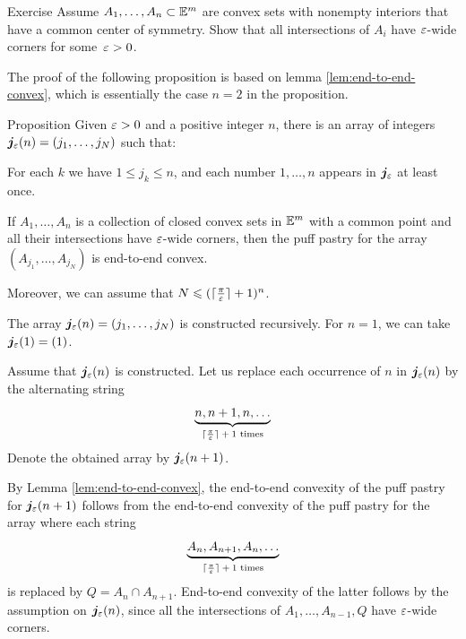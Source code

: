 \begin{thm}[!]{Exercise}\label{ex:centrally-simmetric-walls}
Assume $A_1,\ldots,A_n\subset\mathbb{E}^m$ are
convex sets with nonempty interiors that have a common center of symmetry.
Show that all intersections of $A_i$ have $\varepsilon$-wide corners for some~$\varepsilon>0$.
\end{thm}

The proof of the following proposition is based on lemma \ref{lem:end-to-end-convex}, which is essentially the case $n=2$ in the proposition.

\begin{thm}{Proposition}\label{prop:end-to-end-convex}
Given $\varepsilon>0$ and a positive integer $n$, 
there is an array of integers $\bm{j}_\varepsilon(n)=(j_1,\ldots,j_N)$
such that: 

\begin{subthm}{} For each $k$ we have $1\le j_k\le n$,
and each number $1,\ldots,n$ appears in $\bm{j}_\varepsilon$ at least once.
\end{subthm}

\begin{subthm}{}
If $A_1,\ldots,A_n$ is a collection of closed convex sets in $\mathbb{E}^m$ with a common point
and all their intersections have $\varepsilon$-wide corners,  
then the puff pastry for the array
$(A_{j_1},\ldots,A_{j_N})$ is end-to-end convex.
\end{subthm}

Moreover, we can assume that $N\leqslant (\lceil\tfrac\pi{\varepsilon}\rceil+1)^n$.
\end{thm}

The array $\bm{j}_\varepsilon(n)=(j_1,\ldots,j_N)$  is constructed recursively.
For $n=1$, we can take $\bm{j}_\varepsilon(1)=(1)$.

Assume that $\bm{j}_\varepsilon(n)$ is constructed.
Let us replace each occurrence of $n$ in $\bm{j}_\varepsilon(n)$ by the alternating string 
\[\underbrace{n,n+1,n,\ldots}_{\text{$\lceil\tfrac\pi{\varepsilon}\rceil+1$ times}}\]
Denote the obtained array by $\bm{j}_\varepsilon(n+1)$.

By Lemma \ref{lem:end-to-end-convex},
the end-to-end convexity of the puff pastry for $\bm{j}_\eps(n\z+1)$
follows from the end-to-end convexity of the puff pastry for the array
where each string
\[\underbrace{A_n,A_{n+1},A_n,\ldots}_{\text{$\lceil\tfrac\pi{\varepsilon}\rceil+1$ times}}\]
is replaced by  $Q=A_n\cap A_{n+1}$.
End-to-end convexity of the latter follows by the assumption on $\bm{j}_\varepsilon(n)$, 
since all the intersections of $A_1,\ldots,A_{n-1},Q$
have $\varepsilon$-wide corners.


